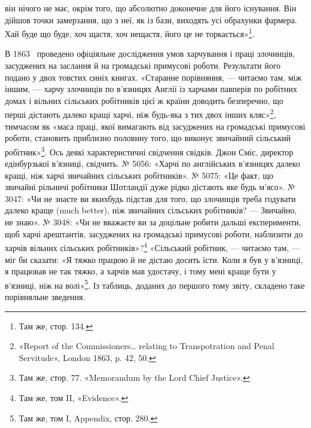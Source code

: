 \parcont{}  %
він нічого не має, окрім того, що абсолютно доконечне для його
існування. Він дійшов точки замерзання, що з неї, як із бази,
виходять усі обрахунки фармера. Хай буде що буде, хоч щастя,
хоч нещастя, його це не торкається»\footnote{
Там же, стор. 134.
}.

В 1863~ проведено офіціяльне дослідження умов харчування
і праці злочинців, засуджених на заслання й на громадські примусові
роботи. Результати його подано у двох товстих синіх
книгах. «Старанне порівняння, — читаємо там, між іншим, —
харчу злочинців по в’язницях Англії із харчами павперів по
робітних домах і вільних сільських робітників цієї ж країни
доводить безперечно, що перші дістають далеко кращі харчі,
ніж будь-яка з тих двох інших кляс»\footnote{
«Report of the Commissioners\dots{} relating to Transpotration and
Penal Servitude», London 1863, p. 42, 50.
}, тимчасом як «маса
праці, якої вимагають від засуджених на громадські примусові
роботи, становить приблизно половину того, що виконує звичайний
сільський робітник»\footnote{
Там же, стор. 77. «Memorandum by the Lord Chief Justice».
}. Ось деякі характеристичні свідчення
свідків. Джон Сміс, директор едінбурзької в’язниці, свідчить.
№ 5056: «Харчі по англійських в’язницях далеко кращі, ніж
харчі звичайних сільських робітників». № 5075: «Це факт, що
звичайні рільничі робітники Шотландії дуже рідко дістають яке
будь м’ясо». № 3047: «Чи не знаєте ви якихбудь підстав для
того, що злочинців треба годувати далеко краще (much better),
ніж звичайних сільських робітників? — Звичайно, не знаю».
№ 3048: «Чи не вважаєте ви за доцільне робити дальші експерименти,
щоб харчі арештантів, засуджених на громадські примусові
роботи, наблизити до харчів вільних сільських робітників»?\footnote{
Там же, том II, «Evidence».
} «Сільський робітник, — читаємо там, — міг би сказати:
«Я тяжко працюю й не дістаю досить їсти. Коли я був у
в’язниці, я працював не так тяжко, а харчів мав удостачу, і тому
мені краще бути у в’язниці, ніж на волі»\footnote{
Там же, том I, Appendix, стор. 280.
}. Із таблиць, доданих
до першого тому звіту, складено таке порівняльне зведення.

